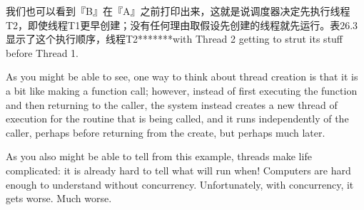 我们也可以看到『B』在『A』之前打印出来，这就是说调度器决定先执行线程T2，即使线程T1更早创建；没有任何理由取假设先创建的线程就先运行。表26.3显示了这个执行顺序，线程T2*******with Thread 2 getting to strut its stuff before Thread 1.

As you might be able to see, one way to think about thread creation is that it is a bit like making a function call; however, instead of first executing the function and then returning to the caller, the system instead creates a new thread of execution for the routine that is being called, and it runs independently of the caller, perhaps before returning from the create, but perhaps much later. 

As you also might be able to tell from this example, threads make life complicated: it is already hard to tell what will run when! Computers are hard enough to understand without concurrency. Unfortunately, with concurrency, it gets worse. Much worse.

